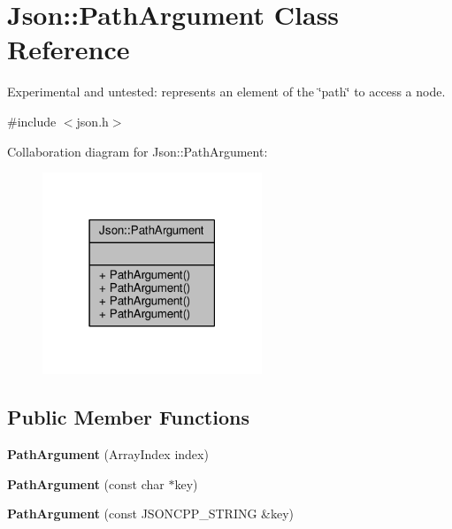 \hypertarget{classJson_1_1PathArgument}{}\section{Json\+:\+:Path\+Argument Class Reference}
\label{classJson_1_1PathArgument}


Experimental and untested\+: represents an element of the \char`\"{}path\char`\"{} to access a node.  




{\ttfamily \#include $<$json.\+h$>$}



Collaboration diagram for Json\+:\+:Path\+Argument\+:
\nopagebreak
\begin{figure}[H]
\begin{center}
\leavevmode
\includegraphics[width=186pt]{da/df0/classJson_1_1PathArgument__coll__graph}
\end{center}
\end{figure}
\subsection*{Public Member Functions}
\begin{DoxyCompactItemize}
\item 
{\bfseries Path\+Argument} (Array\+Index index)\hypertarget{classJson_1_1PathArgument_a53c5b27143b161301b95fd544c139ecf}{}\label{classJson_1_1PathArgument_a53c5b27143b161301b95fd544c139ecf}

\item 
{\bfseries Path\+Argument} (const char $\ast$key)\hypertarget{classJson_1_1PathArgument_a9690417a8a40e6e49f2acdf6c9281345}{}\label{classJson_1_1PathArgument_a9690417a8a40e6e49f2acdf6c9281345}

\item 
{\bfseries Path\+Argument} (const J\+S\+O\+N\+C\+P\+P\+\_\+\+S\+T\+R\+I\+NG \&key)\hypertarget{classJson_1_1PathArgument_ac15f25452124fbf21218897113015301}{}\label{classJson_1_1PathArgument_ac15f25452124fbf21218897113015301}

\end{DoxyCompactItemize}
